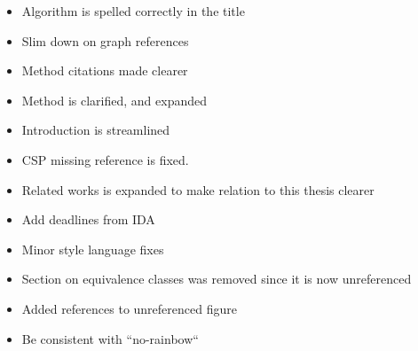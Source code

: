 \documentclass[msc,lith,english]{liuthesis}
\begin{document}
\begin{itemize}
  \item Algorithm is spelled correctly in the title
  \item Slim down on graph references
  \item Method citations made clearer
  \item Method is clarified, and expanded
  \item Introduction is streamlined
  \item CSP missing reference is fixed. 
  \item Related works is expanded to make relation to this thesis clearer
  \item Add deadlines from IDA
  \item Minor style language fixes
  \item Section on equivalence classes was removed since it is now unreferenced
  \item Added references to unreferenced figure
  \item Be consistent with ``no-rainbow``
\end{itemize}
\end{document}

